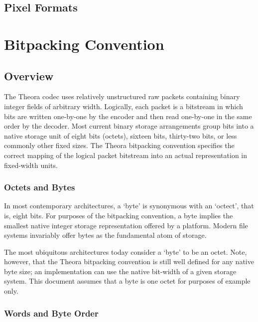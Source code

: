 \documentclass[11pt,letterpaper]{article}
\begin{document}
\subsection{Pixel Formats}

\section{Bitpacking Convention}
\label{sec:bitpacking}

\subsection{Overview}

The Theora codec uses relatively unstructured raw packets containing
 binary integer fields of arbitrary width.
Logically, each packet is a bitstream in which bits are written one-by-one by
 the encoder and then read one-by-one in the same order by the decoder.
Most current binary storage arrangements group bits into a native storage unit
 of eight bits (octets), sixteen bits, thirty-two bits, or less commonly other
 fixed sizes.
The Theora bitpacking convention specifies the correct mapping of the logical
 packet bitstream into an actual representation in fixed-width units.

\subsubsection{Octets and Bytes}

In most contemporary architectures, a `byte' is synonymous with an `octect',
 that is, eight bits.
For purposes of the bitpacking convention, a byte implies the smallest native
 integer storage representation offered by a platform.
Modern file systems invariably offer bytes as the fundamental atom of storage.

The most ubiquitous architectures today consider a `byte' to be an octet.
Note, however, that the Theora bitpacking convention is still well defined for
 any native byte size; an implementation can use the native bit-width of a
 given storage system.
This document assumes that a byte is one octet for purposes of example only.

\subsubsection{Words and Byte Order}
\end{document}
